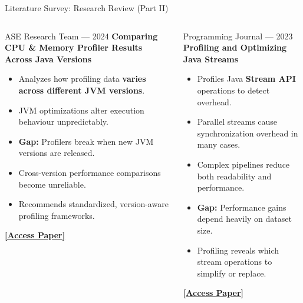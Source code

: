 \documentclass[aspectratio=169]{beamer}
\begin{document}
\begin{frame}{Literature Survey: Research Review (Part II)}
  \footnotesize
  \begin{columns}[T]
      \begin{block}{\color{white}ASE Research Team — 2024}
        \textbf{Comparing CPU \& Memory Profiler Results Across Java Versions}
        \begin{itemize}\scriptsize\itemsep3pt
          \item Analyzes how profiling data \textbf{varies across different JVM versions}.
          \item JVM optimizations alter execution behaviour unpredictably.
          \item \textbf{Gap:} Profilers break when new JVM versions are released.
          \item Cross-version performance comparisons become unreliable.
          \item Recommends standardized, version-aware profiling frameworks.
        \end{itemize}
        \href{https://link.springer.com/article/10.1007/s10515-024-00423-2}%
          {\textcolor{primary}{\textbf{[Access Paper]}}}
      \end{block}
      \begin{block}{\color{white}Programming Journal — 2023}
        \textbf{Profiling and Optimizing Java Streams}
        \begin{itemize}\scriptsize\itemsep3pt
          \item Profiles Java \textbf{Stream API} operations to detect overhead.
          \item Parallel streams cause synchronization overhead in many cases.
          \item Complex pipelines reduce both readability and performance.
          \item \textbf{Gap:} Performance gains depend heavily on dataset size.
          \item Profiling reveals which stream operations to simplify or replace.
        \end{itemize}
        \href{https://programming-journal.org/2023/7/10/}%
          {\textcolor{primary}{\textbf{[Access Paper]}}}
      \end{block}
  \end{columns}
\end{frame}
\end{document}
